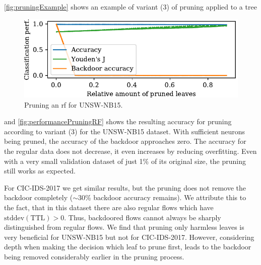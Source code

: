 \documentclass[10pt,sigconf,letterpaper,dvipsnames]{acmart}
\newcommand\note[2]{{\color{#1}#2}}
\newcommand\todo[1]{{\note{red}{TODO: #1}}}
\newcommand{\unsw}{UNSW-NB15}
\newcommand{\cic}{CIC-IDS-2017}
\begin{document}
\autoref{fig:pruningExample} shows an example of variant (3) of pruning applied to a tree
\begin{figure}[h]
\includegraphics[width=\columnwidth]{../prune_CAIA_backdoor_15/prune_oh_d.pdf}
\caption{Pruning an \gls{rf} for \unsw{}.}
\label{fig:performancePruningRF}
\end{figure}
and \autoref{fig:performancePruningRF} shows the resulting accuracy for pruning according to variant (3) for the \unsw{} dataset. With sufficient neurons being pruned, the accuracy of the backdoor approaches zero. The accuracy for the regular data does not decrease, it even increases by
reducing overfitting. %
Even with a very small validation dataset of just 1\% of its original size, the pruning still works as expected.

For \cic{} we get similar results, but the pruning does not remove the backdoor completely ($\sim$30\% backdoor accuracy remains). We attribute this to the fact, that in this dataset there are also regular flows which have $\text{stddev}(\text{TTL}) > 0$. Thus, backdoored flows cannot always be sharply distinguished from regular flows. We find that pruning only harmless leaves is very beneficial for \unsw{} but not for \cic{}. However, considering depth when making the decision which leaf to prune first, leads to the backdoor being removed considerably earlier in the pruning process.
\end{document}
